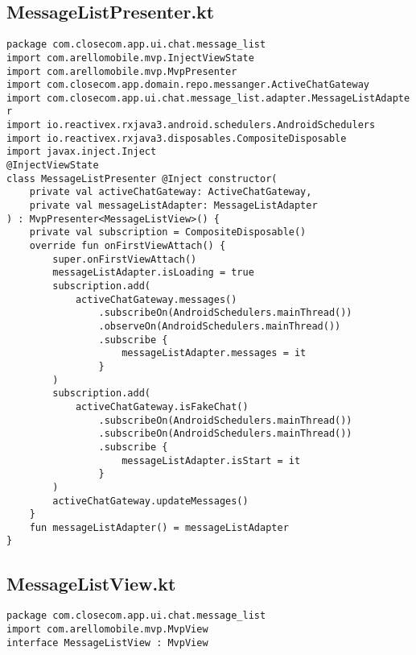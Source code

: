 \documentclass[listing]{espd}
\begin{document}
\subsection{MessageListPresenter.kt}
\begin{verbatim}
package com.closecom.app.ui.chat.message_list
import com.arellomobile.mvp.InjectViewState
import com.arellomobile.mvp.MvpPresenter
import com.closecom.app.domain.repo.messanger.ActiveChatGateway
import com.closecom.app.ui.chat.message_list.adapter.MessageListAdapte
r
import io.reactivex.rxjava3.android.schedulers.AndroidSchedulers
import io.reactivex.rxjava3.disposables.CompositeDisposable
import javax.inject.Inject
@InjectViewState
class MessageListPresenter @Inject constructor(
    private val activeChatGateway: ActiveChatGateway,
    private val messageListAdapter: MessageListAdapter
) : MvpPresenter<MessageListView>() {
    private val subscription = CompositeDisposable()
    override fun onFirstViewAttach() {
        super.onFirstViewAttach()
        messageListAdapter.isLoading = true
        subscription.add(
            activeChatGateway.messages()
                .subscribeOn(AndroidSchedulers.mainThread())
                .observeOn(AndroidSchedulers.mainThread())
                .subscribe {
                    messageListAdapter.messages = it
                }
        )
        subscription.add(
            activeChatGateway.isFakeChat()
                .subscribeOn(AndroidSchedulers.mainThread())
                .subscribeOn(AndroidSchedulers.mainThread())
                .subscribe {
                    messageListAdapter.isStart = it
                }
        )
        activeChatGateway.updateMessages()
    }
    fun messageListAdapter() = messageListAdapter
}
\end{verbatim}

\subsection{MessageListView.kt}
\begin{verbatim}
package com.closecom.app.ui.chat.message_list
import com.arellomobile.mvp.MvpView
interface MessageListView : MvpView
\end{verbatim}
\end{document}
